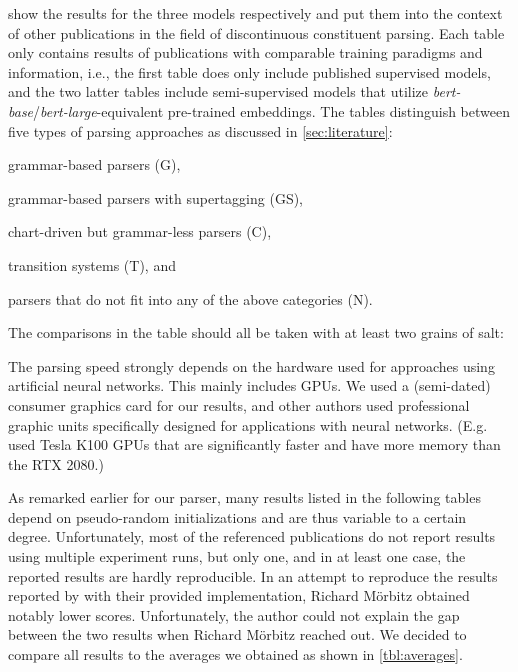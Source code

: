 \documentclass[../../document.tex]{subfiles}
\begin{document}
     show the results for the three models respectively and put them into the context of other publications in the field of discontinuous constituent parsing.
    Each table only contains results of publications with comparable training paradigms and information, i.e.\@, the first table does only include published supervised models, and the two latter tables include semi-supervised models that utilize \emph{bert-base}/\emph{bert-large}-equivalent pre-trained embeddings.
    The tables distinguish between five types of parsing approaches as discussed in \cref{sec:literature}:
    \begin{compactitem}
        \item grammar-based parsers (G),
        \item grammar-based parsers with supertagging (GS),
        \item chart-driven but grammar-less parsers (C),
        \item transition systems (T), and
        \item parsers that do not fit into any of the above categories (N).
    \end{compactitem}
    The comparisons in the table should all be taken with at least two grains of salt:
    \begin{inparaenum}
        \item The parsing speed strongly depends on the hardware used for approaches using artificial neural networks. This mainly includes GPUs. We used a (semi-dated) consumer graphics card for our results, and other authors used professional graphic units specifically designed for applications with neural networks. (E.g.\@ \citet{Cor20} used Tesla K100 GPUs that are significantly faster and have more memory than the RTX 2080.)
        \item As remarked earlier for our parser, many results listed in the following tables depend on pseudo-random initializations and are thus variable to a certain degree. Unfortunately, most of the referenced publications do not report results using multiple experiment runs, but only one, and in at least one case, the reported results are hardly reproducible. In an attempt to reproduce the results reported by \citet{Cor20} with their provided implementation, Richard Mörbitz obtained notably lower scores. Unfortunately, the author could not explain the gap between the two results when Richard Mörbitz reached out. We decided to compare all results to the averages we obtained as shown in \cref{tbl:averages}.
    \end{inparaenum}
\end{document}

